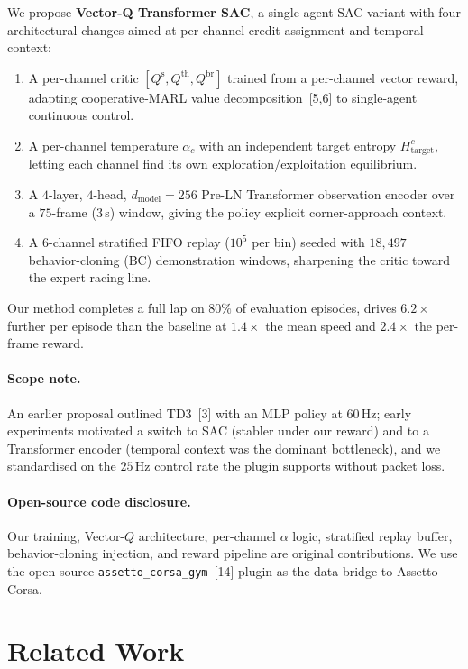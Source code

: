 \documentclass{article}
\begin{document}
We propose \textbf{Vector-Q Transformer SAC}, a single-agent SAC
variant with four architectural changes aimed at per-channel credit
assignment and temporal context:
\begin{enumerate}
  \item A per-channel critic $[Q^{\mathrm{s}}, Q^{\mathrm{th}}, Q^{\mathrm{br}}]$
  trained from a per-channel vector reward, adapting cooperative-MARL
  value decomposition~[5,6] to single-agent continuous control.
  \item A per-channel temperature $\alpha_c$ with an independent
  target entropy $H^c_{\text{target}}$, letting each channel find its
  own exploration/exploitation equilibrium.
  \item A $4$-layer, $4$-head, $d_{\text{model}}{=}256$ Pre-LN
  Transformer observation encoder over a $75$-frame ($3$\,s) window,
  giving the policy explicit corner-approach context.
  \item A $6$-channel stratified FIFO replay ($10^5$ per bin) seeded
  with $18{,}497$ behavior-cloning (BC) demonstration windows,
  sharpening the critic toward the expert racing line.
\end{enumerate}

Our method completes a full lap on $80\%$ of evaluation episodes,
drives $6.2\times$ further per episode than the baseline at
$1.4\times$ the mean speed and $2.4\times$ the per-frame reward.

\paragraph{Scope note.}
An earlier proposal outlined TD3~[3] with an MLP policy at $60$\,Hz;
early experiments motivated a switch to SAC (stabler under our
reward) and to a Transformer encoder (temporal context was the
dominant bottleneck), and we standardised on the $25$\,Hz control
rate the plugin supports without packet loss.

\paragraph{Open-source code disclosure.}
Our training, Vector-$Q$ architecture, per-channel $\alpha$ logic,
stratified replay buffer, behavior-cloning injection, and reward
pipeline are original contributions. We use the open-source
\texttt{assetto\_corsa\_gym}~[14] plugin as the data bridge to
Assetto Corsa.

\section{Related Work}
\label{sec:related}
\end{document}
